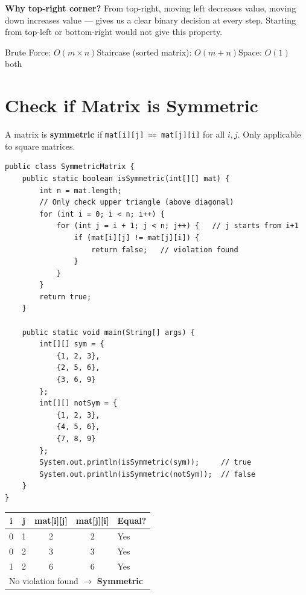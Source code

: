 \documentclass[12pt,a4paper,oneside]{book}
\begin{document}
\begin{interviewcorner}
\textbf{Why top-right corner?} From top-right, moving left decreases value, moving down increases value --- gives us a clear binary decision at every step. Starting from top-left or bottom-right would not give this property.
\end{interviewcorner}

\begin{complexity}
Brute Force: $O(m \times n)$\quad Staircase (sorted matrix): $O(m + n)$\quad Space: $O(1)$ both
\end{complexity}

\section{Check if Matrix is Symmetric}

A matrix is \textbf{symmetric} if \texttt{mat[i][j] == mat[j][i]} for all $i, j$. Only applicable to square matrices.

\begin{lstlisting}[caption={Check Symmetric --- only compare upper triangle, O(n$^2$/2)}]
public class SymmetricMatrix {
    public static boolean isSymmetric(int[][] mat) {
        int n = mat.length;
        // Only check upper triangle (above diagonal)
        for (int i = 0; i < n; i++) {
            for (int j = i + 1; j < n; j++) {   // j starts from i+1
                if (mat[i][j] != mat[j][i]) {
                    return false;   // violation found
                }
            }
        }
        return true;
    }

    public static void main(String[] args) {
        int[][] sym = {
            {1, 2, 3},
            {2, 5, 6},
            {3, 6, 9}
        };
        int[][] notSym = {
            {1, 2, 3},
            {4, 5, 6},
            {7, 8, 9}
        };
        System.out.println(isSymmetric(sym));     // true
        System.out.println(isSymmetric(notSym));  // false
    }
}
\end{lstlisting}

\begin{dryrun}
\begin{center}
\begin{tabular}{ccccl}
\toprule
\textbf{i} & \textbf{j} & \textbf{mat[i][j]} & \textbf{mat[j][i]} & \textbf{Equal?}\\
\midrule
0 & 1 & 2 & 2 & Yes\\
0 & 2 & 3 & 3 & Yes\\
1 & 2 & 6 & 6 & Yes\\
\multicolumn{5}{l}{No violation found $\to$ \textbf{Symmetric}}\\
\bottomrule
\end{tabular}
\end{center}
\end{dryrun}
\end{document}
